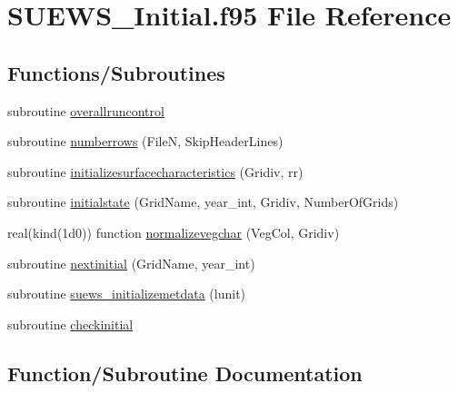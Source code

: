 \hypertarget{_s_u_e_w_s___initial_8f95}{}\section{S\+U\+E\+W\+S\+\_\+\+Initial.\+f95 File Reference}
\label{_s_u_e_w_s___initial_8f95}
\subsection*{Functions/\+Subroutines}
\begin{DoxyCompactItemize}
\item 
subroutine \hyperlink{_s_u_e_w_s___initial_8f95_a328749e978914d5cb633b8d642a92d75}{overallruncontrol}
\item 
subroutine \hyperlink{_s_u_e_w_s___initial_8f95_ae822e367ccfe96c8a005e1ca117059eb}{numberrows} (FileN, Skip\+Header\+Lines)
\item 
subroutine \hyperlink{_s_u_e_w_s___initial_8f95_a60d2335c00fd453336ef8b8a74b907c7}{initializesurfacecharacteristics} (Gridiv, rr)
\item 
subroutine \hyperlink{_s_u_e_w_s___initial_8f95_a9e4519818c5c3fcbefcdd1e02030275b}{initialstate} (Grid\+Name, year\+\_\+int, Gridiv, Number\+Of\+Grids)
\item 
real(kind(1d0)) function \hyperlink{_s_u_e_w_s___initial_8f95_abdf1692da63bcfb0be44f468cab89c10}{normalizevegchar} (Veg\+Col, Gridiv)
\item 
subroutine \hyperlink{_s_u_e_w_s___initial_8f95_acde97a1be2a58d77e93b4348c1595689}{nextinitial} (Grid\+Name, year\+\_\+int)
\item 
subroutine \hyperlink{_s_u_e_w_s___initial_8f95_aecb9f7926254a01f8ea8e4f74fe2f6c1}{suews\+\_\+initializemetdata} (lunit)
\item 
subroutine \hyperlink{_s_u_e_w_s___initial_8f95_a0e2e4356ea9fffb9d1ccaee3e377d2c9}{checkinitial}
\end{DoxyCompactItemize}


\subsection{Function/\+Subroutine Documentation}
\mbox{\label{_s_u_e_w_s___initial_8f95_a0e2e4356ea9fffb9d1ccaee3e377d2c9}} 
